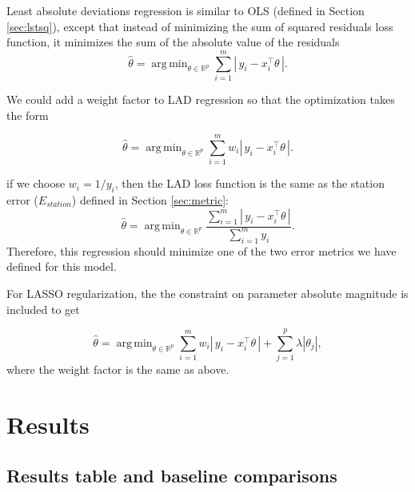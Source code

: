 \documentclass[11pt]{report}
\DeclareMathOperator*{\argmin}{arg\,min}
\begin{document}
Least absolute deviations regression is similar to OLS (defined in Section \ref{sec:lstsq}), except that instead of minimizing the sum of squared residuals loss function, it minimizes the sum of the absolute value of the residuals
\[\hat{\theta} = \argmin_{\theta\in\mathbb{R}^p}\sum_{i=1}^m \left|\,y_i - x_i^{\top} \theta \,\right|.\]

We could add a weight factor to LAD regression so that the optimization takes the form

\[\hat{\theta} = \argmin_{\theta\in\mathbb{R}^p}\sum_{i=1}^m w_i \left|\,y_i - x_i^{\top} \theta \,\right|.\]

if we choose $w_i = 1 / y_i$, then the LAD loss function is the same as the station error ($E_{station}$) defined in Section \ref{sec:metric}:
\[\hat{\theta} = \argmin_{\theta\in\mathbb{R}^p}\displaystyle\frac{\sum\limits_{i=1}^m \left|\,y_i - x_i^{\top} \theta \,\right|}{\sum\limits_{i=1}^{m}y_i}.\] Therefore, this regression should minimize one of the two error metrics we have defined for this model. 

For LASSO regularization, the the constraint on parameter absolute magnitude is included to get

\[\hat{\theta} = \argmin_{\theta\in\mathbb{R}^p}\sum_{i=1}^m w_i \left|\,y_i - x_i^{\top} \theta \,\right| + \sum_{j=1}^p\lambda\left|\theta_j\right|,\] where the weight factor is the same as above.






\chapter{Results}

\section{Results table and baseline comparisons}
\end{document}
